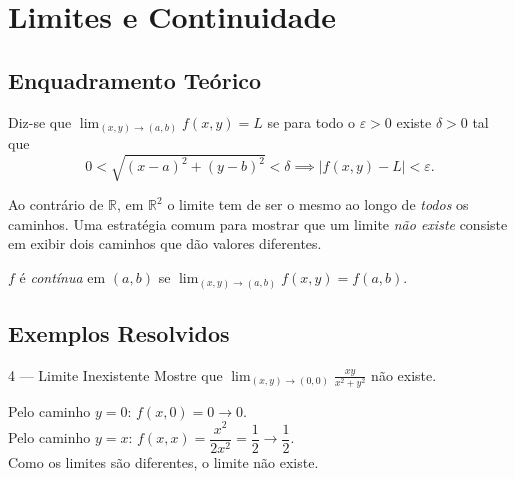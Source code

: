 \section{Limites e Continuidade}

\subsection{Enquadramento Teórico}

\begin{defbox}[title={Limite em $\mathbb{R}^2$}]
  Diz-se que $\displaystyle\lim_{(x,y)\to(a,b)}f(x,y) = L$ se para todo o
  $\varepsilon>0$ existe $\delta>0$ tal que
  \[
    0 < \sqrt{(x-a)^2+(y-b)^2} < \delta \implies |f(x,y)-L|<\varepsilon.
  \]
\end{defbox}

\begin{notebox}[title={Estratégia: Provar que um Limite Não Existe}]
  Ao contrário de $\mathbb{R}$, em $\mathbb{R}^2$ o limite tem de ser o mesmo
  ao longo de \emph{todos} os caminhos. Uma estratégia comum para mostrar que
  um limite \emph{não existe} consiste em exibir dois caminhos que dão valores
  diferentes.
\end{notebox}

\begin{defbox}[title={Continuidade em $\mathbb{R}^2$}]
  $f$ é \emph{contínua} em $(a,b)$ se
  $\displaystyle\lim_{(x,y)\to(a,b)}f(x,y)=f(a,b)$.
\end{defbox}

\subsection{Exemplos Resolvidos}

\begin{exbox}{4 --- Limite Inexistente}
  Mostre que $\displaystyle\lim_{(x,y)\to(0,0)}\frac{xy}{x^2+y^2}$ não existe.
\end{exbox}
\begin{solbox}
  Pelo caminho $y=0$: $f(x,0)=0\to 0$.\\
  Pelo caminho $y=x$: $f(x,x)=\dfrac{x^2}{2x^2}=\dfrac{1}{2}\to\dfrac{1}{2}$.\\
  Como os limites são diferentes, o limite não existe.
\end{solbox}
